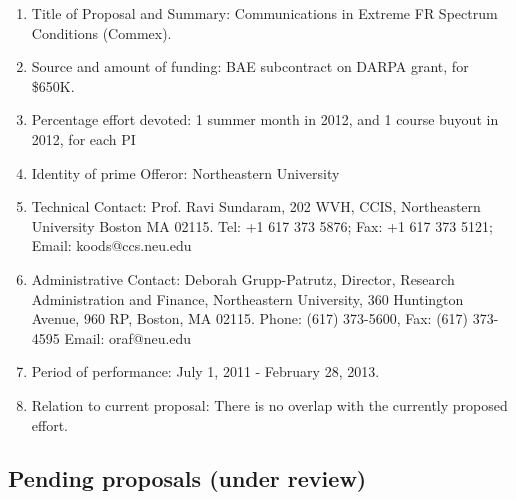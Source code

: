 \begin{enumerate}
\item Title of Proposal and Summary: Communications in Extreme FR Spectrum Conditions (Commex). 
\item Source and amount of funding: BAE subcontract on DARPA grant, for \$650K.
\item Percentage effort devoted: 1 summer month in 2012, and 1 course buyout in 2012, for each PI
\item Identity of prime Offeror: Northeastern University
\item Technical Contact: Prof. Ravi Sundaram,  202 WVH, CCIS, Northeastern University
Boston MA 02115.  Tel: +1 617 373 5876;  Fax: +1 617 373 5121;  Email: koods@ccs.neu.edu 
\item Administrative Contact: Deborah Grupp-Patrutz, Director,
  Research Administration and Finance, Northeastern University, 360
  Huntington Avenue, 960 RP, Boston, MA 02115. Phone: (617) 373-5600,
  Fax: (617) 373-4595 Email: oraf@neu.edu
\item  Period of performance: July 1, 2011 - February 28, 2013.
\item Relation to current proposal: There is no overlap with the currently proposed effort.
\end{enumerate}

\subsection{Pending proposals (under review)}

